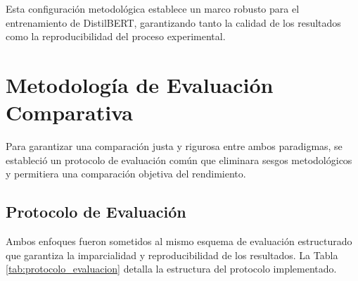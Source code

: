 Esta configuración metodológica establece un marco robusto para el entrenamiento de DistilBERT, garantizando tanto la calidad de los resultados como la reproducibilidad del proceso experimental.

\section{Metodología de Evaluación Comparativa}
\label{sec:evaluacion_comparativa}

Para garantizar una comparación justa y rigurosa entre ambos paradigmas, se estableció un protocolo de evaluación común que eliminara sesgos metodológicos y permitiera una comparación objetiva del rendimiento.

\subsection{Protocolo de Evaluación}

Ambos enfoques fueron sometidos al mismo esquema de evaluación estructurado que garantiza la imparcialidad y reproducibilidad de los resultados. La Tabla \ref{tab:protocolo_evaluacion} detalla la estructura del protocolo implementado.

